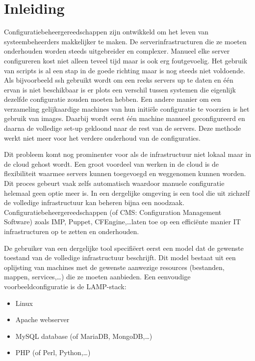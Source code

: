 \chapter{Inleiding}
\label{inleiding}
Configuratiebeheergereedschappen zijn ontwikkeld om het leven van systeembeheerders makkelijker te maken.
De serverinfrastructuren die ze moeten onderhouden worden steeds uitgebreider en complexer.
Manueel elke server configureren kost niet alleen teveel tijd maar is ook erg foutgevoelig.
Het gebruik van scripts is al een stap in de goede richting maar is nog steeds niet voldoende.
Als bijvoorbeeld ssh gebruikt wordt om een reeks servers up te daten en \'e\'en ervan is niet beschikbaar is er plots een verschil tussen systemen die eigenlijk dezelfde configuratie zouden moeten hebben. 
Een andere manier om een verzameling gelijkaardige machines van hun initi\"ele configuratie te voorzien is het gebruik van images.
Daarbij wordt eerst \'e\'en machine manueel geconfigureerd en daarna de volledige set-up gekloond naar de rest van de servers.
Deze methode werkt niet meer voor het verdere onderhoud van de configuraties.

Dit probleem komt nog prominenter voor als de infrastructuur niet lokaal maar in de cloud gehost wordt.
Een groot voordeel van werken in de cloud is de flexibiliteit waarmee servers kunnen toegevoegd en weggenomen kunnen worden.
Dit proces gebeurt vaak zelfs automatisch waardoor manuele configuratie helemaal geen optie meer is. 
In een dergelijke omgeving is een tool die uit zichzelf de volledige infrastructuur kan beheren bijna een noodzaak.
Configuratiebeheergereedschappen (of CMS: Configuration Management Software) zoals IMP, Puppet, CFEngine,\ldots laten toe op een effici\"ente manier IT infrastructuren op te zetten en onderhouden. 

De gebruiker van een dergelijke tool specifi\"eert eerst een model dat de gewenste toestand van de volledige infrastructuur beschrijft.
Dit model bestaat uit een oplijsting van machines met de gewenste aanwezige resources (bestanden, mappen, services,\ldots) die ze moeten aanbieden.
Een eenvoudige voorbeeldconfiguratie is de LAMP-stack: 
\begin{itemize}
  \item Linux
  \item Apache webserver
  \item MySQL database (of MariaDB, MongoDB,\ldots)
  \item PHP (of Perl, Python,\ldots)
\end{itemize}

